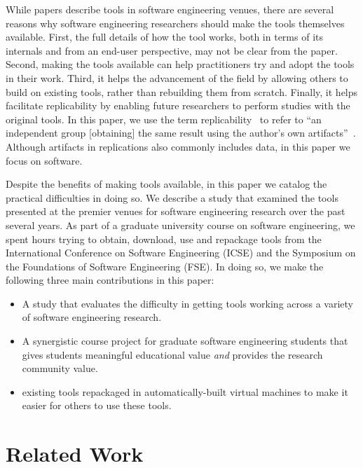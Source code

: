 \documentclass[10pt,conference]{IEEEtran}
\begin{document}
While papers describe tools in software engineering venues,
there are several reasons why software engineering researchers 
should make the tools themselves available.
First, the full details of how the tool works, both in terms of its internals
and from an end-user perspective, may not be clear from the paper.
Second, making the tools available can help practitioners try and adopt
the tools in their work.
Third, it helps the advancement of the field by allowing others to build on 
existing tools, rather than rebuilding them from scratch.
Finally, it helps facilitate replicability by enabling future researchers
to perform studies with the original tools.
In this paper, we use the term replicability~\cite{vim2004international}
to refer to ``an independent group [obtaining] the same result using 
the author's own artifacts''~\cite{acmArtifactPolicy}.
Although artifacts in replications also commonly includes data,
in this paper we focus on software.

Despite the benefits of making tools available, in this paper
we catalog the practical difficulties in doing so.
We describe a study that examined the tools presented at the 
premier venues for software engineering research over the 
past several years.
As part of a graduate university course on software engineering, 
we spent \durationTotal hours trying to obtain, download, use
and repackage tools from the International Conference
on Software Engineering (ICSE) and the Symposium on the Foundations
of Software Engineering (FSE).
In doing so, we make the following three main 
contributions in this paper:

\begin{itemize}
  \item A study that evaluates the difficulty in getting \totalToolsTried tools 
  		working across a variety of software engineering research.
  \item A synergistic course project for graduate software engineering students 
		that gives students meaningful educational value \emph{and}
		provides the research community value.
  \item \permissionToRedistribute existing tools repackaged in automatically-built virtual machines
  		to make it easier for others to use these tools.
\end{itemize}

\section{Related Work}
\end{document}
